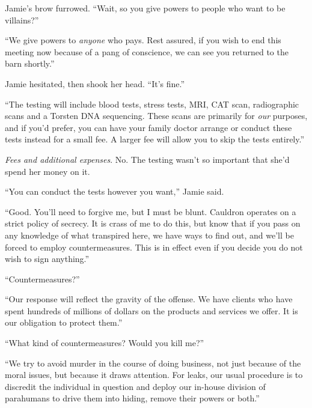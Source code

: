Jamie's brow furrowed.  ``Wait, so you give powers to people who want to be villains?''



``We give powers to \emph{anyone} who pays.  Rest assured, if you wish to end this meeting now because of a pang of conscience, we can see you returned to the barn shortly.''



Jamie hesitated, then shook her head.  ``It's fine.''



``The testing will include blood tests, stress tests, MRI, CAT scan, radiographic scans and a Torsten DNA sequencing.  These scans are primarily for \emph{our} purposes, and if you'd prefer, you can have your family doctor arrange or conduct these tests instead for a small fee.  A larger fee will allow you to skip the tests entirely.''



\emph{Fees and additional expenses}.  No.  The testing wasn't so important that she'd spend her money on it.



``You can conduct the tests however you want,'' Jamie said.



``Good.  You'll need to forgive me, but I must be blunt.  Cauldron operates on a strict policy of secrecy.  It is crass of me to do this, but know that if you pass on any knowledge of what transpired here, we have ways to find out, and we'll be forced to employ countermeasures.  This is in effect even if you decide you do not wish to sign anything.''



``Countermeasures?''



``Our response will reflect the gravity of the offense.  We have clients who have spent hundreds of millions of dollars on the products and services we offer.  It is our obligation to protect them.''



``What kind of countermeasures?  Would you kill me?''



``We try to avoid murder in the course of doing business, not just because of the moral issues, but because it draws attention.  For leaks, our usual procedure is to discredit the individual in question and deploy our in-house division of parahumans to drive them into hiding, remove their powers or both.''



